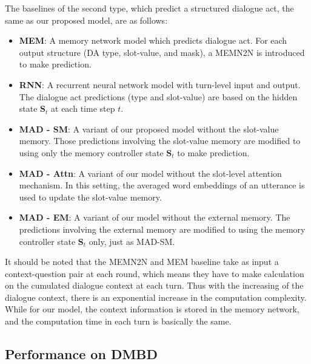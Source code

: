 The baselines of the second type, which predict a structured dialogue act, the same as our proposed model, are as follows:

\begin{itemize}

\item {\bf MEM}: A memory network model which predicts dialogue act. For each output structure (DA type, slot-value, and mask), a MEMN2N is introduced to make prediction.

\item {\bf RNN}: A recurrent neural network model with turn-level input and output. The dialogue act predictions (type and slot-value) are based on the hidden state $\bm{S}_t$ at each time step $t$.

\item {\bf MAD - SM}: A variant of our proposed model without the slot-value memory. Those predictions involving the slot-value memory are modified to using only the memory controller state $\bm{S}_t$ to make prediction.

\item {\bf MAD - Attn}: A variant of our model without the slot-level attention mechanism. In this setting, the averaged word embeddings of an utterance is used to update the slot-value memory.

\item {\bf MAD - EM}: A variant of our model without the external memory. The predictions involving the external memory are modified to using the memory controller state $\bm{S}_t$ only, just as MAD-SM.
\\
\end{itemize}

It should be noted that the MEMN2N and MEM baseline take as input a context-question pair at each round, which means they have to make calculation on the cumulated dialogue context at each turn. Thus with the increasing of the dialogue context, there is an exponential increase in the computation complexity. While for our model, the context information is stored in the memory network, and the computation time in each turn is basically the same.


\subsection{Performance on DMBD}

